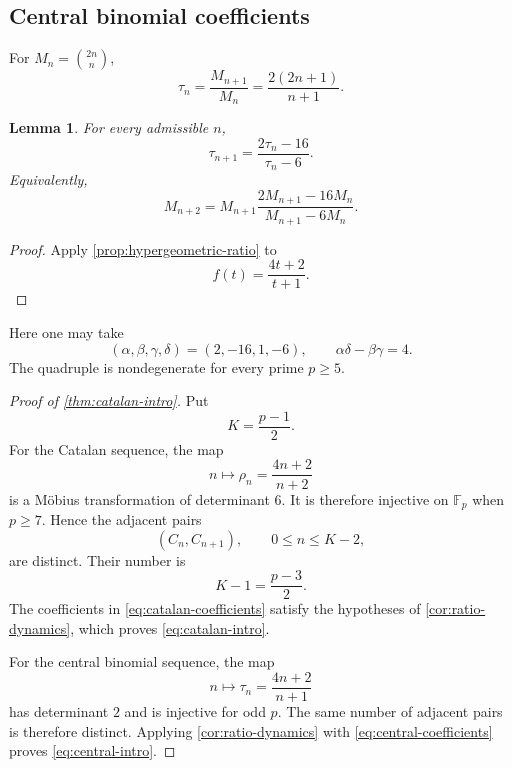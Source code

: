 \documentclass[11pt,reqno]{amsart}
\numberwithin{equation}{section}
\newtheorem{lemma}[lemma]{Lemma}
\theoremstyle{definition}
\theoremstyle{remark}
\newcommand{\F}{\mathbb F}
\begin{document}
\subsection{Central binomial coefficients}

For $M_n=\binom{2n}{n}$,
\begin{equation}\label{eq:central-ratio}
  \tau_n=\frac{M_{n+1}}{M_n}
  =\frac{2(2n+1)}{n+1}.
\end{equation}

\begin{lemma}\label{lem:central-ratio}
For every admissible $n$,
\begin{equation}\label{eq:central-mobius}
  \tau_{n+1}=\frac{2\tau_n-16}{\tau_n-6}.
\end{equation}
Equivalently,
\begin{equation}\label{eq:central-transition}
  M_{n+2}
  =M_{n+1}\frac{2M_{n+1}-16M_n}{M_{n+1}-6M_n}.
\end{equation}
\end{lemma}

\begin{proof}
Apply \cref{prop:hypergeometric-ratio} to
\[
  f(t)=\frac{4t+2}{t+1}.
\]
\end{proof}

Here one may take
\begin{equation}\label{eq:central-coefficients}
  (\alpha,\beta,\gamma,\delta)=(2,-16,1,-6),
  \qquad
  \alpha\delta-\beta\gamma=4.
\end{equation}
The quadruple is nondegenerate for every prime $p\ge5$.

\begin{proof}[Proof of \cref{thm:catalan-intro}]
Put
\[
  K=\frac{p-1}{2}.
\]
For the Catalan sequence, the map
\[
  n\longmapsto\rho_n=\frac{4n+2}{n+2}
\]
is a M\"obius transformation of determinant $6$.  It is therefore injective on $\F_p$ when $p\ge7$.  Hence the adjacent pairs
\[
  (C_n,C_{n+1}),
  \qquad 0\le n\le K-2,
\]
are distinct.  Their number is
\[
  K-1=\frac{p-3}{2}.
\]
The coefficients in \eqref{eq:catalan-coefficients} satisfy the hypotheses of \cref{cor:ratio-dynamics}, which proves \eqref{eq:catalan-intro}.

For the central binomial sequence, the map
\[
  n\longmapsto\tau_n=\frac{4n+2}{n+1}
\]
has determinant $2$ and is injective for odd $p$.  The same number of adjacent pairs is therefore distinct.  Applying \cref{cor:ratio-dynamics} with \eqref{eq:central-coefficients} proves \eqref{eq:central-intro}.
\end{proof}
\end{document}
